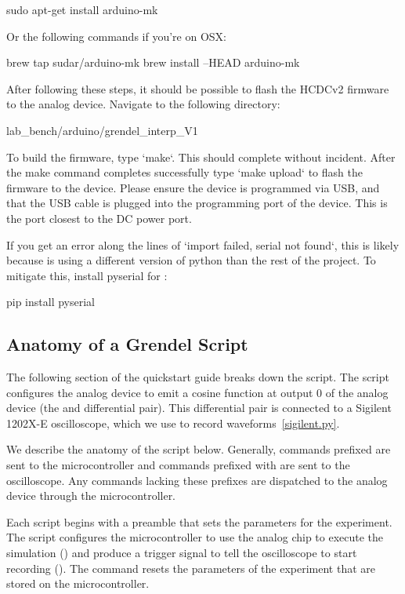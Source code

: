 \begin{snippet}
sudo apt-get install arduino-mk
\end{snippet}

Or the following commands if you're on OSX:
\begin{snippet}
brew tap sudar/arduino-mk
brew install --HEAD arduino-mk

After following these steps, it should be possible to flash the HCDCv2 firmware to the analog device. Navigate
to the following directory:
\begin{snippet}
lab_bench/arduino/grendel_interp_V1
\end{snippet}

To build the firmware, type `make`. This should complete without incident. After the make command completes 
successfully type `make upload` to flash the firmware to the device. Please ensure the device is programmed via USB,
and that the USB cable is plugged into the programming port of the device. This is the port closest to the DC power port. 

If you get an error along the lines of `import failed, serial not found`, this is likely because  is using 
a different version of python than the rest of the project. To mitigate this, install pyserial for :

\begin{snippet}
pip install pyserial
\end{snippet}

\subsection{Anatomy of a Grendel Script}

The following section of the quickstart guide breaks down the 
 script. The 
script configures the analog device to emit a
cosine function at output 0 of the analog device (the  and 
differential pair). This differential pair is connected to a Sigilent 1202X-E
oscilloscope, which we use to record waveforms~\ref{sigilent.py}.

We describe the anatomy of the \grendel script below. Generally, commands
prefixed  are sent to the microcontroller and commands prefixed with
 are sent to the oscilloscope. Any commands lacking these prefixes are
dispatched to the analog device through the microcontroller.


Each \grendel script begins with a preamble that sets the parameters for the
experiment. The  script configures the microcontroller to use the
analog chip to execute the simulation () and produce a
trigger signal to tell the oscilloscope to start recording (). The 
command resets the parameters of the experiment that are stored on the
microcontroller.


\end{snippet}
